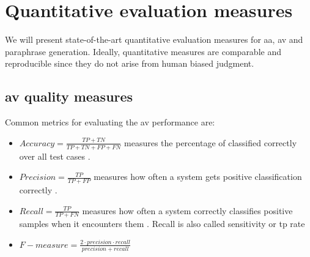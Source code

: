 \section{Quantitative evaluation measures}

We will present state-of-the-art quantitative evaluation measures for \ac{aa}, \ac{av} and paraphrase generation.
Ideally, quantitative measures are comparable and reproducible since they do not arise from human biased judgment.

\subsection{\ac{av} quality measures}
\label{subsec:av_quality_measures}

Common metrics for evaluating the \ac{av} performance are:
\begin{itemize}
    \item $Accuracy = \frac{TP + TN}{TP + TN + FP + FN}$ \citep{elmanarelbouanani_authorship_2014,neal_surveying_2018} 
    measures the percentage of classified correctly over all test cases \citep{neal_surveying_2018}.

    \item $Precision = \frac{TP}{TP + FP}$ \citep{elmanarelbouanani_authorship_2014,neal_surveying_2018,chen_web_2008} 
    measures how often a system gets positive classification correctly \citep{neal_surveying_2018}.

    \item $Recall = \frac{TP}{TP + FN}$ \citep{elmanarelbouanani_authorship_2014,neal_surveying_2018,chen_web_2008} 
    measures how often a system correctly classifies positive samples when it encounters them \citep{neal_surveying_2018}.
    Recall is also called sensitivity or \acl{tp} rate \citep{palivela_optimization_2021}

    \item $F-measure = \frac{2 \cdot precision \cdot recall}{precision + recall}$~\citep{chen_web_2008,abbasi_writeprints_2008}


\end{itemize}
